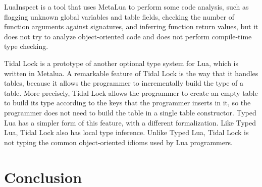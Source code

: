 \documentclass[preprint]{sig-alternate}
\begin{document}
LuaInspect \citep{luainspect} is a tool that uses MetaLua to perform
some code analysis, such as flagging unknown global variables and
table fields, checking the number of function arguments against
signatures, and inferring function return values, but it does not
try to analyze object-oriented code and does not perform compile-time
type checking.

Tidal Lock \citep{tidallock} is a prototype of another optional type
system for Lua, which is written in Metalua.
A remarkable feature of Tidal Lock is the way that it handles tables,
because it allows the programmer to incrementally build the type of
a table.
More precisely, Tidal Lock allows the programmer to create an empty
table to build its type according to the keys that the programmer
inserts in it, so the programmer does not need to build the table in
a single table constructor.
Typed Lua has a simpler form of this feature, with a different
formalization.
Like Typed Lua, Tidal Lock also has local type inference.
Unlike Typed Lua, Tidal Lock is not typing the common object-oriented
idioms used by Lua programmers.

\section{Conclusion} \label{sec:con}



\end{document}
